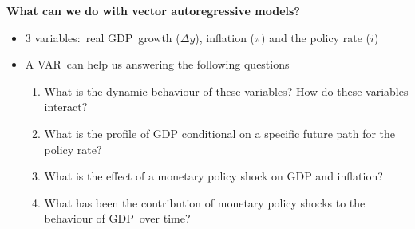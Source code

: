 \documentclass[10pt,handout]{beamer}
\begin{document}
\vspace{.1cm}

\begin{frame}
{\textbf{What can we do with vector autoregressive models?}}

\begin{itemize}
\item 3 variables:\ real GDP\ growth ($\Delta y$), inflation ($\pi $) and
the policy rate ($i$)\medskip \pause

\item A VAR\ can help us answering the following questions\smallskip

\begin{enumerate}
\item What is the dynamic behaviour of these variables? How do these
variables interact?\smallskip \pause

\item What is the profile of GDP conditional on a specific future path for
the policy rate? \smallskip \pause

\item What is the effect of a monetary policy shock on GDP and
inflation?\smallskip \pause

\item What has been the contribution of monetary policy shocks to the
behaviour of GDP\ over time?
\end{enumerate}
\end{itemize}
\end{frame}

\vspace{.1cm}
\end{document}
